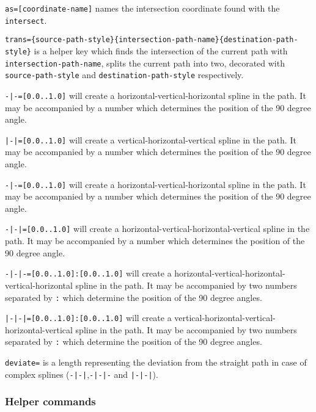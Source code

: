 \begin{optionslist}
\item \texttt{as=[coordinate-name]} names the intersection coordinate found with the \texttt{intersect}.
\item \texttt{trans=\{source-path-style\}\{intersection-path-name\}\{destination-path-style\}} is a helper key which finds the intersection of the current path with \texttt{intersection-path-name}, splits the current path into two, decorated with \texttt{source-path-style} and  \texttt{destination-path-style} respectively.
\item \texttt{-|-=[0.0..1.0]} will create a horizontal-vertical-horizontal spline in the path. It may be accompanied by a number which determines the position of the 90 degree angle.
\item \texttt{|-|=[0.0..1.0]} will create a vertical-horizontal-vertical spline in the path. It may be accompanied by a number which determines the position of the 90 degree angle.
\item \texttt{-|-=[0.0..1.0]} will create a horizontal-vertical-horizontal spline in the path. It may be accompanied by a number which determines the position of the 90 degree angle.
\item \texttt{-|-|=[0.0..1.0]} will create a horizontal-vertical-horizontal-vertical spline in the path. It may be accompanied by a number which determines the position of the 90 degree angle.
\item \texttt{-|-|-=[0.0..1.0]:[0.0..1.0]} will create a horizontal-vertical-horizontal-vertical-horizontal spline in the path. It may be accompanied by two numbers  separated by \texttt{:} which determine the position of the 90 degree angles.
\item \texttt{|-|-|=[0.0..1.0]:[0.0..1.0]} will create a vertical-horizontal-vertical-horizontal-vertical spline in the path. It may be accompanied by two numbers  separated by \texttt{:} which determine the position of the 90 degree angles.
\item \texttt{deviate=} is a length representing the deviation from the straight path in case of complex splines (\texttt{-|-|},\texttt{-|-|-} and \texttt{|-|-|}).
\end{optionslist}

\subsubsection{Helper commands}
\label{sec:helper-commands}

